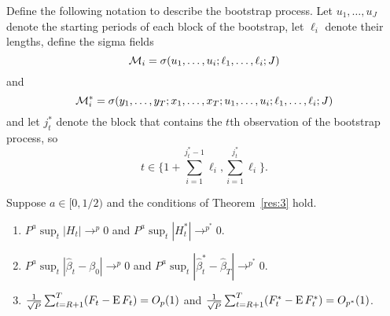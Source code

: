 \documentclass[12pt,fleqn]{article}
\begin{document}
Define the following notation to describe the bootstrap process. Let
$u_1,\dots,u_{J}$ denote the starting periods of each block of the
bootstrap, let $\ell_i$ denote their lengths, define the sigma fields
\[
  \mathcal{M}_i = \sigma(u_1,\dots,u_i; \ell_1,\dots,\ell_i; J)
\]
and
\[
  \mathcal{M}_i^* = \sigma(y_1,\dots,y_T; x_1,\dots, x_T;u_1,\dots,u_i; \ell_1,\dots,\ell_i; J)
\]
and let $j^*_t$ denote the block that contains the $t$th observation
of the bootstrap process, so
\[
  t \in \{1 + \sum_{i=1}^{j^*_t-1} \ell_i, \sum_{i=1}^{j^*_t} \ell_i\}.
\]


\begin{lema}\label{res:a2}
  Suppose $a \in [0,1/2)$ and the conditions of Theorem~\ref{res:3}
  hold.
  \begin{enumerate}
  \item $P^a \sup_t | H_{t} | \to^p 0$ and $P^a \sup_t | H_{t}^{*} |
    \to^{p^{*}} 0$.
  \item $P^a \sup_t | \hat{\beta}_{t} - \beta_{0} | \to^{p} 0$ and
    $P^a \sup_t | \hat{\beta}^{*}_{t} - \hat{\beta}_T |
    \to^{p^{*}} 0$.
  \item $\tfrac{1}{\sqrt{P}} \sum_{t=R+1}^T (F_t - \operatorname{E} F_t) = O_{p}(1)$
    and $\tfrac{1}{\sqrt{P}} \sum_{t=R+1}^T (F_t^* - \operatorname{E} F_t^*) =
    O_{p^*}(1)$.
  \end{enumerate}
\end{lema}
\end{document}

